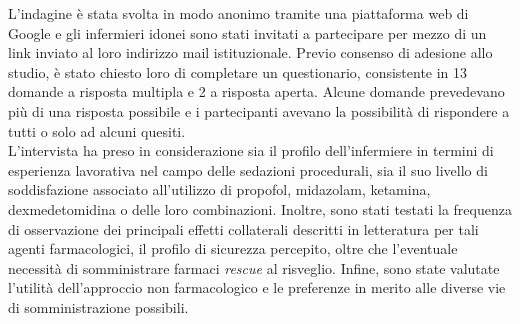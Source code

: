 L'indagine è stata svolta in modo anonimo tramite una piattaforma web di Google e gli infermieri idonei sono stati invitati a partecipare per mezzo di un link inviato al loro indirizzo mail istituzionale. Previo consenso di adesione allo studio, è stato chiesto loro di completare un questionario, consistente in 13 domande a risposta multipla e 2 a risposta aperta. Alcune domande prevedevano più di una risposta possibile e i partecipanti avevano la possibilità di rispondere a tutti o solo ad alcuni quesiti. 
\\L'intervista ha preso in considerazione sia il profilo dell'infermiere in termini di esperienza lavorativa nel campo delle sedazioni procedurali, sia il suo livello di soddisfazione associato all'utilizzo di propofol, midazolam, ketamina, dexmedetomidina o delle loro combinazioni. Inoltre, sono stati testati la frequenza di osservazione dei principali effetti collaterali descritti in letteratura per tali agenti farmacologici, il profilo di sicurezza percepito, oltre che l'eventuale necessità di somministrare farmaci \emph{rescue} al risveglio. Infine, sono state valutate l'utilità dell'approccio non farmacologico e le preferenze in merito alle diverse vie di somministrazione possibili. 

\newpage

